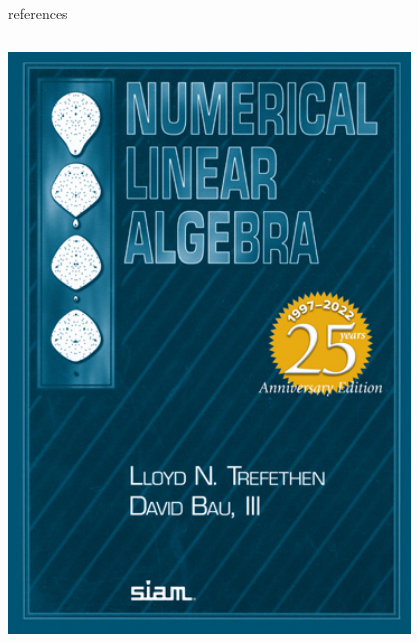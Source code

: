 \documentclass[10pt,
               svgnames,
               hyperref={colorlinks,citecolor=DeepPink4,linkcolor=FireBrick,urlcolor=Maroon},
               usepdftitle=false]{beamer}
\begin{document}
\begin{frame}{references}
\begin{columns}
\begin{column}{0.17\textwidth}
\medskip
\hfill \includegraphics[width=0.8\textwidth]{images/trefethenbau.jpg}
\end{column}
\end{columns}
\end{frame}
\end{document}
